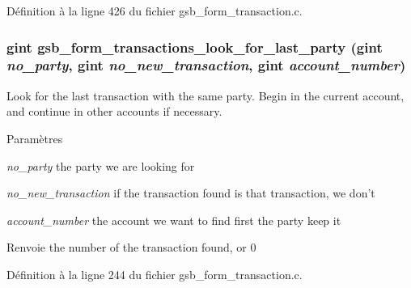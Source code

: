 Définition à la ligne 426 du fichier gsb\_\-form\_\-transaction.c.

\subsubsection[{gsb\_\-form\_\-transactions\_\-look\_\-for\_\-last\_\-party}]{\setlength{\rightskip}{0pt plus 5cm}gint gsb\_\-form\_\-transactions\_\-look\_\-for\_\-last\_\-party (gint {\em no\_\-party}, \/  gint {\em no\_\-new\_\-transaction}, \/  gint {\em account\_\-number})}\label{gsb__form__transaction_8h_a94d3117aba63e480771a5f124c4dc459}
Look for the last transaction with the same party. Begin in the current account, and continue in other accounts if necessary.


\begin{DoxyParams}{Paramètres}
\item[{\em no\_\-party}]the party we are looking for \item[{\em no\_\-new\_\-transaction}]if the transaction found is that transaction, we don't \item[{\em account\_\-number}]the account we want to find first the party keep it\end{DoxyParams}
\begin{DoxyReturn}{Renvoie}
the number of the transaction found, or 0 
\end{DoxyReturn}


Définition à la ligne 244 du fichier gsb\_\-form\_\-transaction.c.


